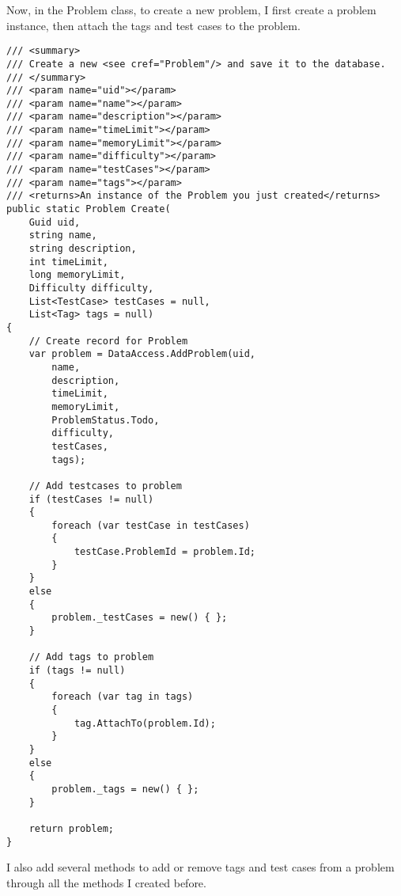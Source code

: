 \documentclass[report.tex]{subfiles}
\begin{document}
Now, in the Problem class, to create a new problem, I first create a problem instance, then attach the tags and test cases to the problem.

\begin{verbatim}
/// <summary>
/// Create a new <see cref="Problem"/> and save it to the database.
/// </summary>
/// <param name="uid"></param>
/// <param name="name"></param>
/// <param name="description"></param>
/// <param name="timeLimit"></param>
/// <param name="memoryLimit"></param>
/// <param name="difficulty"></param>
/// <param name="testCases"></param>
/// <param name="tags"></param>
/// <returns>An instance of the Problem you just created</returns>
public static Problem Create(
    Guid uid,
    string name,
    string description,
    int timeLimit,
    long memoryLimit,
    Difficulty difficulty,
    List<TestCase> testCases = null,
    List<Tag> tags = null)
{
    // Create record for Problem
    var problem = DataAccess.AddProblem(uid,
        name,
        description,
        timeLimit,
        memoryLimit,
        ProblemStatus.Todo,
        difficulty,
        testCases,
        tags);

    // Add testcases to problem
    if (testCases != null)
    {
        foreach (var testCase in testCases)
        {
            testCase.ProblemId = problem.Id;
        }
    }
    else
    {
        problem._testCases = new() { };
    }

    // Add tags to problem
    if (tags != null)
    {
        foreach (var tag in tags)
        {
            tag.AttachTo(problem.Id);
        }
    }
    else
    {
        problem._tags = new() { };
    }

    return problem;
}
\end{verbatim}

I also add several methods to add or remove tags and test cases from a problem through all the methods I created before.
\end{document}
